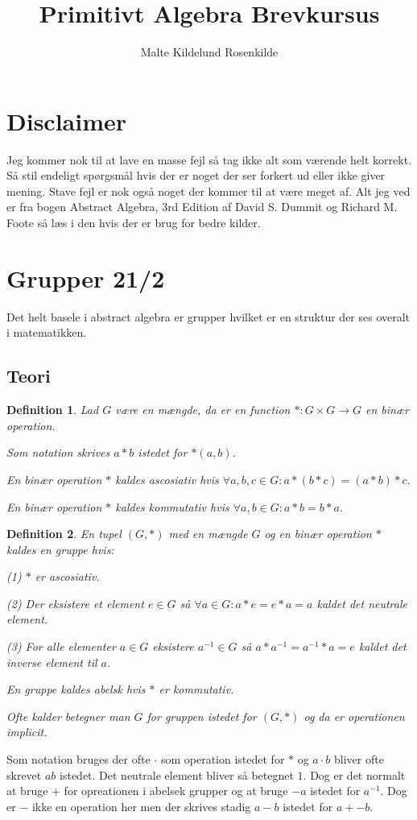 \documentclass{article}
\title{Primitivt Algebra Brevkursus}
\author{Malte Kildelund Rosenkilde}
\newcommand{\inv}{^{-1}}
\newcommand{\too}{\rightarrow}
\newtheorem{defi}{Definition}
\begin{document}
	\maketitle
	\newpage

	\section*{Disclaimer}
		Jeg kommer nok til at lave en masse fejl så tag ikke alt som værende helt
		korrekt. Så stil endeligt spørgsmål hvis der er noget der ser forkert ud
		eller ikke giver mening.
		Stave fejl er nok også noget der kommer til at være meget af.
		Alt jeg ved er fra bogen
		Abstract Algebra, 3rd Edition af David S. Dummit og Richard M. Foote
		så læs i den hvis der er brug for bedre kilder.
	\section*{Grupper 21/2}
		Det helt basele i abstract algebra er grupper hvilket er en struktur der
		ses overalt i matematikken.
		\subsection*{Teori}
		\begin{defi}
			Lad $G$ være en mængde, da er en function $*: G \times G \too G$
			en binær operation.

			Som notation skrives $a*b$ istedet for $*(a,b)$.

			En binær operation $*$ kaldes ascosiativ hvis
			$\forall a,b,c \in G: a*(b*c) = (a*b)*c$.

			En binær operation $*$ kaldes kommutativ hvis
			$\forall a,b \in G: a*b = b*a$.
		\end{defi}
		\begin{defi}
			En tupel $(G,*)$ med en mængde $G$ og en binær operation $*$ kaldes
			en gruppe hvis:

			(1) $*$ er ascosiativ.

			(2) Der eksistere et element $e \in G$ så $\forall a \in G: a*e=e*a=a$
			kaldet det neutrale element.

			(3) For alle elementer $a \in G$ eksistere $a\inv \in G$ så
			$a*a\inv = a\inv*a = e$ kaldet det inverse element til $a$.

			En gruppe kaldes abelsk hvis $*$ er kommutativ.

			Ofte kalder betegner man $G$ for gruppen istedet for $(G,*)$ og
			da er operationen implicit.
		\end{defi}
		Som notation bruges der ofte $\cdot$ som operation istedet for $*$ og
		$a\cdot b$ bliver ofte skrevet $ab$ istedet. Det neutrale element bliver så
		betegnet $1$. Dog er det normalt at bruge
		$+$ for opreationen i abelsek grupper og at bruge $-a$ istedet for $a\inv$.
		Dog er $-$ ikke en operation her men der skrives stadig $a-b$ istedet for $a+-b$.
\end{document}
